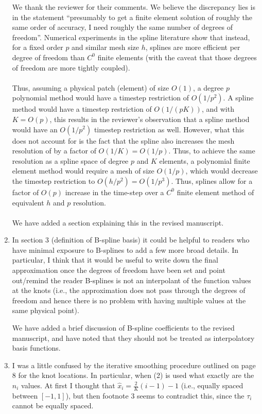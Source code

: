 \documentclass[10pt]{article}
\newcommand{\note}[1]{{\color{violet}#1}}
\begin{document}
\begin{enumerate}
\note{We thank the reviewer for their comments.  We believe the discrepancy lies is in the statement ``presumably to get a finite element solution of roughly the same order of accuracy, I need roughly the same number of degrees of freedom''.  Numerical experiments in the spline literature show that instead, for a fixed order $p$ and similar mesh size $h$, splines are more efficient per degree of freedom than $C^0$ finite elements \cite{evans2009n} (with the caveat that those degrees of freedom are more tightly coupled).  
\\
\\
Thus, assuming a physical patch (element) of size $O(1)$, a degree $p$ polynomial method would have a timestep restriction of $O(1/p^2)$.  A spline method would have a timestep restriction of $O(1/(pK))$, and with $K = O(p)$, this results in the reviewer's observation that a spline method would have an $O(1/p^2)$ timestep restriction as well.  However, what this does not account for is the fact that the spline also increases the mesh resolution of by a factor of $O(1/K) = O(1/p)$.  Thus, to achieve the same resolution as a spline space of degree $p$ and $K$ elements, a polynomial finite element method would require a mesh of size $O(1/p)$, which would decrease the timestep restriction to $O(h/p^2) = O(1/p^3)$.  Thus, splines allow for a factor of $O(p)$ increase in the time-step over a $C^0$ finite element method of equivalent $h$ and $p$ resolution.  
\\
\\
We have added a section explaining this in the revised manuscript.
}

\item In section 3 (definition of B-spline basis) it could be helpful to readers who have minimal exposure to B-splines to add a few more broad details. In particular, I think that it would be useful to write down the final approximation once the degrees of freedom have been set and point out/remind the reader B-splines is not an interpolant of the function values at the knots (i.e., the approximation does not pass through the degrees of freedom and hence there is no problem with having multiple values at the same physical point).

\note{We have added a brief discussion of B-spline coefficients to the revised manuscript, and have noted that they should not be treated as interpolatory basis functions.}

\item I was a little confused by the iterative smoothing procedure outlined on page 8 for the knot locations. In particular, when (2) is used what exactly are the $\hat{n}_{i}$ values. At first I thought that $\hat{x}_{i} = \frac{2}{K}(i-1)-1$ (i.e., equally spaced between $[-1,1]$), but then footnote 3 seems to contradict this, since the $\tau_{i}$ cannot be equally spaced.


\end{enumerate}
\end{document}
